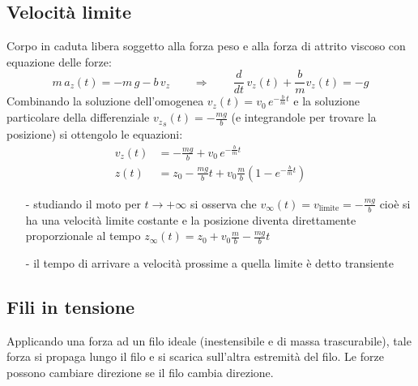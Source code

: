 \documentclass[a4paper]{article}
\newcommand\dt{\frac{d}{dt}\,}
\begin{document}
\newpage

\subsection{Velocità limite}
Corpo in caduta libera soggetto alla forza peso e alla forza di attrito viscoso con equazione delle forze:
\[m \, a_z(t) = -m \, g -b \, v_z \qquad \Rightarrow \qquad \dt v_z(t) + \frac{b}{m} v_z(t) = -g\]
Combinando la soluzione dell'omogenea \(\displaystyle v_z(t) = v_0 \, e^{- \frac{b}{m} t}\) e la soluzione particolare della
differenziale \(\displaystyle {v_z}_s(t) = -\frac{m g}{b}\) (e integrandole per trovare la posizione) si ottengolo le equazioni:
\begin{align*}
	v_z(t) &= -\frac{mg}{b} + v_0 \, e^{-\frac{b}{m}t} \\
	z(t) &= z_0 -\frac{mg}{b}t + v_0 \frac{m}{b} \left(1-e^{-\frac{b}{m}t}\right)
\end{align*}
\begin{itemize}[topsep=3pt, itemsep=0pt]
	\item[-] studiando il moto per \(t \to +\infty\) si osserva che \(\displaystyle v_\infty(t) = v_\text{limite} = -\frac{mg}{b}\)
	cioè si ha una velocità limite costante e la posizione diventa direttamente proporzionale al tempo \(\displaystyle z_\infty(t) = z_0 + v_0 \frac{m}{b} - \frac{mg}{b} t\)
	\item[-] il tempo di arrivare a velocità prossime a quella limite è detto transiente
\end{itemize}

\subsection{Fili in tensione}
Applicando una forza ad un filo ideale (inestensibile e di massa trascurabile), tale forza si propaga lungo il filo e si scarica
sull'altra estremità del filo. Le forze possono cambiare direzione se il filo cambia direzione.
\end{document}
